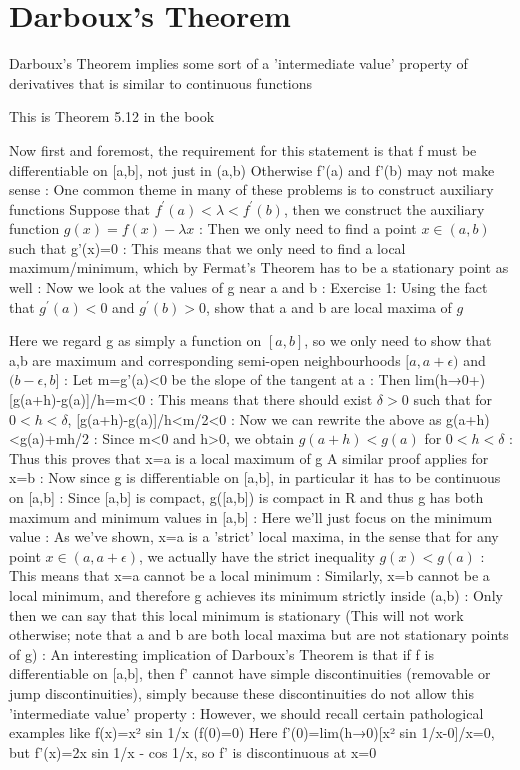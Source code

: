 \section{Darboux's Theorem}
Darboux's Theorem implies some sort of a 'intermediate value' property of derivatives that is similar to continuous functions

This is Theorem 5.12 in the book

Now first and foremost, the requirement for this statement is that f must be differentiable on [a,b], not just in (a,b)
Otherwise f'(a) and f'(b) may not make sense
:
One common theme in many of these problems is to construct auxiliary functions
Suppose that $f^\prime(a)<\lambda<f^\prime(b)$, then we construct the auxiliary function $g(x)=f(x)-\lambda x$
:
Then we only need to find a point $x\in(a,b)$ such that g'(x)=0
:
This means that we only need to find a local maximum/minimum, which by Fermat's Theorem has to be a stationary point as well
:
Now we look at the values of g near a and b
:
Exercise 1: Using the fact that $g^\prime(a)<0$ and $g^\prime(b)>0$, show that a and b are local maxima of $g$

Here we regard g as simply a function on $[a,b]$, so we only need to show that a,b are maximum and corresponding semi-open neighbourhoods $[a,a+\epsilon)$ and $(b-\epsilon,b]$
:
Let m=g'(a)<0 be the slope of the tangent at a
:
Then lim(h→0+)[g(a+h)-g(a)]/h=m<0
:
This means that there should exist $\delta>0$ such that for $0<h<\delta$, [g(a+h)-g(a)]/h<m/2<0
:
Now we can rewrite the above as
g(a+h)<g(a)+mh/2
:
Since m<0 and h>0, we obtain
$g(a+h)<g(a)$ for $0<h<\delta$
:
Thus this proves that x=a is a local maximum of g
A similar proof applies for x=b
:
Now since g is differentiable on [a,b], in particular it has to be continuous on [a,b]
:
Since [a,b] is compact, g([a,b]) is compact in R and thus g has both maximum and minimum values in [a,b]
:
Here we'll just focus on the minimum value
:
As we've shown, x=a is a 'strict' local maxima, in the sense that for any point $x\in(a,a+\epsilon)$, we actually have the strict inequality $g(x)<g(a)$
:
This means that x=a cannot be a local minimum
:
Similarly, x=b cannot be a local minimum, and therefore g achieves its minimum strictly inside (a,b)
:
Only then we can say that this local minimum is stationary
(This will not work otherwise; note that a and b are both local maxima but are not stationary points of g)
:
An interesting implication of Darboux's Theorem is that if f is differentiable on [a,b], then f' cannot have simple discontinuities (removable or jump discontinuities), simply because these discontinuities do not allow this 'intermediate value' property
:
However, we should recall certain pathological examples like f(x)=x² sin 1/x (f(0)=0)
Here f'(0)=lim(h→0)[x² sin 1/x-0]/x=0, but f'(x)=2x sin 1/x - cos 1/x, so f' is discontinuous at x=0


